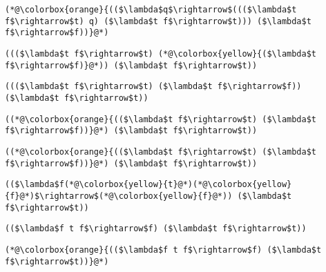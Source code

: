 \documentclass{beamer}
\begin{document}
\begin{frame}[fragile]{\CurrentSection}
\lstset{basicstyle=\ttfamily\small}\lstset{numbers=none}\lstset{language=ML}\begin{lstlisting}
(*@\colorbox{orange}{(($\lambda$q$\rightarrow$((($\lambda$t f$\rightarrow$t) q) ($\lambda$t f$\rightarrow$t))) ($\lambda$t f$\rightarrow$f))}@*)
\end{lstlisting}
\pause\lstset{language=ML}\begin{lstlisting}
((($\lambda$t f$\rightarrow$t) (*@\colorbox{yellow}{($\lambda$t f$\rightarrow$f)}@*)) ($\lambda$t f$\rightarrow$t))
\end{lstlisting}

\end{frame}

\begin{frame}[fragile]{\CurrentSection}
\lstset{basicstyle=\ttfamily\small}\lstset{numbers=none}\lstset{language=ML}\begin{lstlisting}
((($\lambda$t f$\rightarrow$t) ($\lambda$t f$\rightarrow$f)) ($\lambda$t f$\rightarrow$t))
\end{lstlisting}
\pause\lstset{language=ML}\begin{lstlisting}
((*@\colorbox{orange}{(($\lambda$t f$\rightarrow$t) ($\lambda$t f$\rightarrow$f))}@*) ($\lambda$t f$\rightarrow$t))
\end{lstlisting}

\end{frame}

\begin{frame}[fragile]{\CurrentSection}
\lstset{basicstyle=\ttfamily\small}\lstset{numbers=none}\lstset{language=ML}\begin{lstlisting}
((*@\colorbox{orange}{(($\lambda$t f$\rightarrow$t) ($\lambda$t f$\rightarrow$f))}@*) ($\lambda$t f$\rightarrow$t))
\end{lstlisting}
\pause\lstset{language=ML}\begin{lstlisting}
(($\lambda$f(*@\colorbox{yellow}{t}@*)(*@\colorbox{yellow}{f}@*)$\rightarrow$(*@\colorbox{yellow}{f}@*)) ($\lambda$t f$\rightarrow$t))
\end{lstlisting}

\end{frame}

\begin{frame}[fragile]{\CurrentSection}
\lstset{basicstyle=\ttfamily\small}\lstset{numbers=none}\lstset{language=ML}\begin{lstlisting}
(($\lambda$f t f$\rightarrow$f) ($\lambda$t f$\rightarrow$t))
\end{lstlisting}
\pause\lstset{language=ML}\begin{lstlisting}
(*@\colorbox{orange}{(($\lambda$f t f$\rightarrow$f) ($\lambda$t f$\rightarrow$t))}@*)
\end{lstlisting}

\end{frame}
\end{document}
